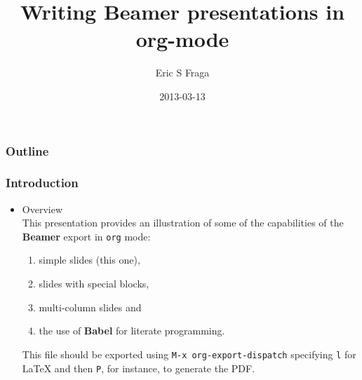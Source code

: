 \documentclass[bigger]{beamer}
\title{Writing Beamer presentations in org-mode}
\author{Eric S Fraga}
\date{2013-03-13}
\begin{document}
\maketitle

\begin{frame}
\frametitle{Outline}
\setcounter{tocdepth}{2}
\tableofcontents
\end{frame}








\begin{frame}
\frametitle{Introduction}
\label{sec-1}
\begin{itemize}

\item Overview\\
\label{sec-1-1}%
This presentation provides an illustration of some of the capabilities of the \textbf{Beamer} export in \texttt{org} mode:

\begin{enumerate}
\item simple slides (this one),
\item slides with special blocks,
\item multi-column slides and
\item the use of \textbf{Babel} for literate programming.
\end{enumerate}

   This file should be exported using \texttt{M-x org-export-dispatch} specifying \texttt{l} for \LaTeX{} and then \texttt{P}, for instance, to generate the PDF.

\end{itemize} %
\end{frame}
\end{document}
